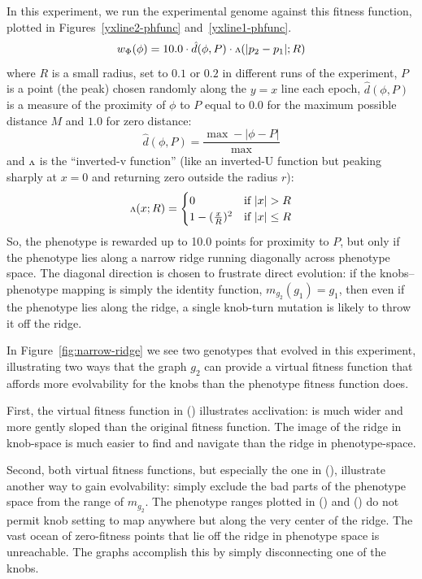 \documentclass[letterpaper]{article}
\newcommand{\invv}{\ensuremath{\rotatebox[origin=c]{180}{\textrm{v}}}\xspace}
\begin{document}
In this experiment, we run the experimental genome against this fitness
function, plotted in Figures~\ref{yxline2-phfunc} and~\ref{yxline1-phfunc}.
\[
   w_\Phi(\phi) = 10.0 \cdot \hat{d}(\phi, P) \cdot \invv(|p_2 - p_1|; R)
\]
where
$R$ is a small radius, set to $0.1$ or $0.2$ in different runs of the
experiment,
$P$ is a point (the peak) chosen randomly along the $y=x$ line each epoch,
$\hat{d}(\phi, P)$ is a measure of the proximity of $\phi$ to $P$ equal to
$0.0$ for the maximum possible distance $M$ and $1.0$ for zero distance:
\[
\hat{d}(\phi, P) = \frac{\max - |\phi - P|}{\max}
\]
and \invv is the ``inverted-v function'' (like an inverted-U function but
peaking sharply at $x=0$ and returning zero outside the radius $r$):
\[
   \invv(x; R) =
   \begin{cases}
      0 & \text{if } |x|>R \\
      1 - (\frac{x}{R})^2 &
      \text{if } |x|\leq R
   \end{cases}
\]
So, the phenotype is rewarded up to 10.0 points for proximity to $P$, but only
if the phenotype lies along a narrow ridge running diagonally across phenotype
space. The diagonal direction is chosen to frustrate direct evolution: if the
knobs–phenotype mapping is simply the identity function, $m_{g_2}(g_1)=g_1$,
then even if the phenotype lies along the ridge, a single knob-turn mutation
is likely to throw it off the ridge.

In Figure~\ref{fig:narrow-ridge} we see two genotypes that evolved in this
experiment, illustrating two ways that the graph $g_2$ can provide a virtual
fitness function that affords more evolvability for the knobs than the
phenotype fitness function does.

First, the virtual fitness function in () illustrates
acclivation: is much wider and more gently sloped than the original fitness
function. The image of the ridge in knob-space is much easier to find and
navigate than the ridge in phenotype-space.

Second, both virtual fitness functions, but especially the one in
(), illustrate another way to gain evolvability:
simply exclude the bad parts of the phenotype space from the range of
$m_{g_2}$. The phenotype ranges plotted in ()
and ()
do not permit  knob setting to map anywhere but along the very
center of the ridge. The vast ocean of zero-fitness points that lie off the
ridge in phenotype space is unreachable. The graphs accomplish this by simply
disconnecting one of the knobs.
\end{document}
